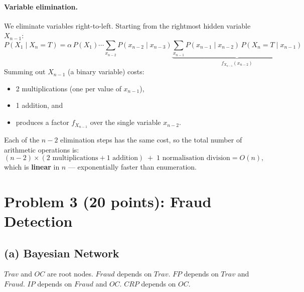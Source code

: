 \documentclass[12pt]{article}
\begin{document}
\paragraph{Variable elimination.}
We eliminate variables right-to-left. Starting from the rightmost hidden variable $X_{n-1}$:
\[
P(X_1\mid X_n{=}T)=\alpha\,P(X_1)\cdots\sum_{x_{n-2}}P(x_{n-2}\mid x_{n-3})
\underbrace{\sum_{x_{n-1}}P(x_{n-1}\mid x_{n-2})\,P(X_n{=}T\mid x_{n-1})}_{f_{X_{n-1}}(x_{n-2})}
\]
Summing out $X_{n-1}$ (a binary variable) costs:
\begin{itemize}
  \item 2 multiplications (one per value of $x_{n-1}$),
  \item 1 addition, and
  \item produces a factor $f_{X_{n-1}}$ over the single variable $x_{n-2}$.
\end{itemize}
Each of the $n-2$ elimination steps has the same cost, so the total number of arithmetic
operations is:
\[
(n-2)\times(2\text{ multiplications}+1\text{ addition})\;+\;1\text{ normalisation division}
=O(n),
\]
which is \textbf{linear} in $n$ --- exponentially faster than enumeration.

\newpage
\section{Problem 3 (20 points): Fraud Detection}

\subsection*{(a) Bayesian Network}

$\textit{Trav}$ and $\textit{OC}$ are root nodes.
$\textit{Fraud}$ depends on $\textit{Trav}$.
$\textit{FP}$ depends on $\textit{Trav}$ and $\textit{Fraud}$.
$\textit{IP}$ depends on $\textit{Fraud}$ and $\textit{OC}$.
$\textit{CRP}$ depends on $\textit{OC}$.

\begin{center}
\end{center}
\end{document}
